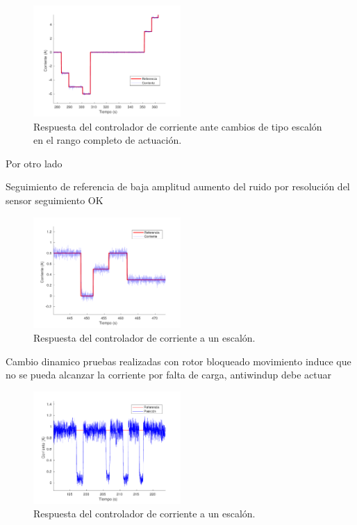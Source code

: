 \begin{figure}[h]
  \centering
  \includegraphics[width=0.5\textwidth]{img/cap5/corriente_cambio_referencia_alto.pdf}
  \caption{Respuesta del controlador de corriente ante cambios de tipo escalón en el rango completo de actuación.}
  \label{cap5_corriente_cambio_referencia_alto}
\end{figure}

Por otro lado

Seguimiento de referencia de baja amplitud
aumento del ruido por resolución del sensor
seguimiento OK

\begin{figure}[h]
  \centering
  \includegraphics[width=0.5\textwidth]{img/cap5/corriente_cambio_referencia_bajo.pdf}
  \caption{Respuesta del controlador de corriente a un escalón.}
  \label{cap5_corriente_cambio_referencia_bajo}
\end{figure}




Cambio dinamico
pruebas realizadas con rotor bloqueado
movimiento induce que no se pueda alcanzar la corriente por falta de carga, antiwindup debe actuar

\begin{figure}[h]
  \centering
  \includegraphics[width=0.5\textwidth]{img/cap5/cambio_dinamico_corriente.pdf}
  \caption{Respuesta del controlador de corriente a un escalón.}
  \label{cap5_cambio_dinamico_corriente}
\end{figure}


